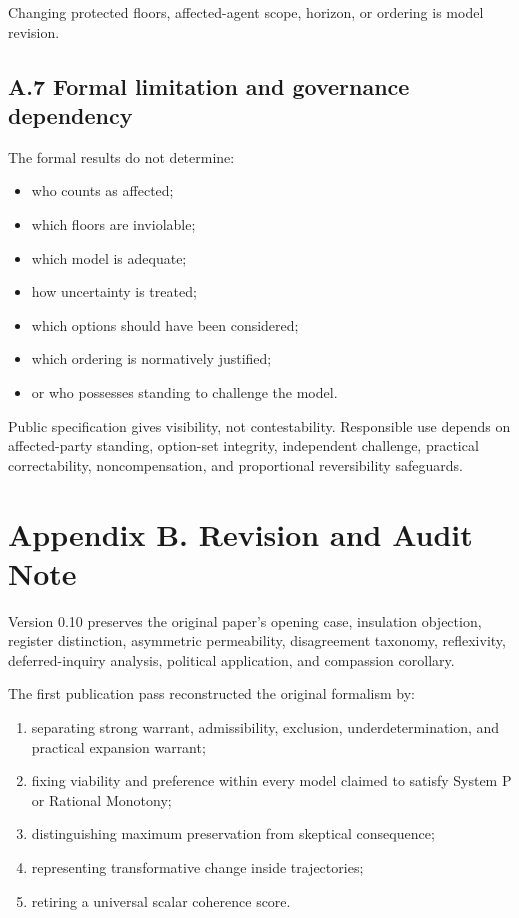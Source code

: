 \documentclass[
  11pt,
]{article}
\providecommand{\tightlist}{%
  \setlength{\itemsep}{0pt}\setlength{\parskip}{0pt}}
\begin{document}
Changing protected floors, affected-agent scope, horizon, or ordering is
model revision.

\subsection{A.7 Formal limitation and governance
dependency}\label{a.7-formal-limitation-and-governance-dependency}

The formal results do not determine:

\begin{itemize}
\tightlist
\item
  who counts as affected;
\item
  which floors are inviolable;
\item
  which model is adequate;
\item
  how uncertainty is treated;
\item
  which options should have been considered;
\item
  which ordering is normatively justified;
\item
  or who possesses standing to challenge the model.
\end{itemize}

Public specification gives visibility, not contestability. Responsible
use depends on affected-party standing, option-set integrity,
independent challenge, practical correctability, noncompensation, and
proportional reversibility safeguards.

\section{Appendix B. Revision and Audit
Note}\label{appendix-b.-revision-and-audit-note}

Version 0.10 preserves the original paper's opening case, insulation
objection, register distinction, asymmetric permeability, disagreement
taxonomy, reflexivity, deferred-inquiry analysis, political application,
and compassion corollary.

The first publication pass reconstructed the original formalism by:

\begin{enumerate}
\def\labelenumi{\arabic{enumi}.}
\tightlist
\item
  separating strong warrant, admissibility, exclusion,
  underdetermination, and practical expansion warrant;
\item
  fixing viability and preference within every model claimed to satisfy
  System P or Rational Monotony;
\item
  distinguishing maximum preservation from skeptical consequence;
\item
  representing transformative change inside trajectories;
\item
  retiring a universal scalar coherence score.
\end{enumerate}
\end{document}
